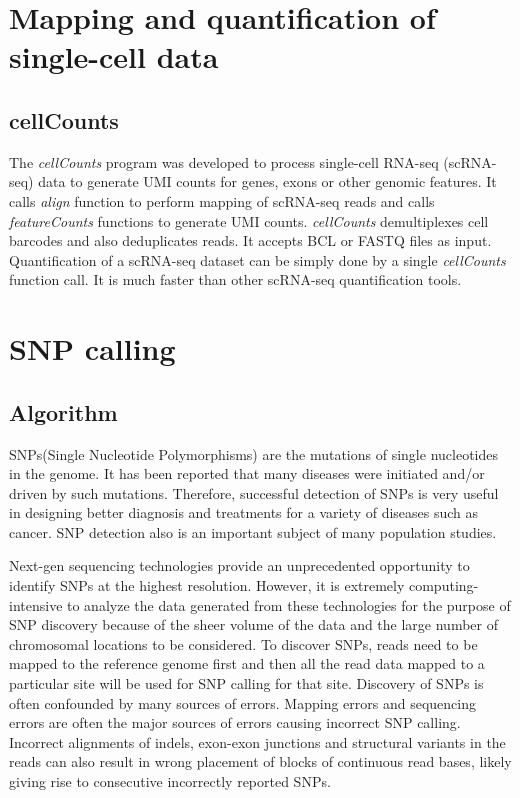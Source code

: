 \documentclass[12pt]{report}
\begin{document}
\chapter{Mapping and quantification of single-cell data}

\section{cellCounts}

The \emph{cellCounts} program was developed to process single-cell RNA-seq (scRNA-seq) data to generate UMI counts for genes, exons or other genomic features.
It calls \emph{align} function to perform mapping of scRNA-seq reads and calls \emph{featureCounts} functions to generate UMI counts.
\emph{cellCounts} demultiplexes cell barcodes and also deduplicates reads.
It accepts BCL or FASTQ files as input.
Quantification of a scRNA-seq dataset can be simply done by a single \emph{cellCounts} function call.
It is much faster than other scRNA-seq quantification tools.

\chapter{SNP calling}

\section{Algorithm}

SNPs(Single Nucleotide Polymorphisms) are the mutations of single nucleotides in the genome.
It has been reported that many diseases were initiated and/or driven by such mutations.
Therefore, successful detection of SNPs is very useful in designing better diagnosis and treatments for a variety of diseases such as cancer.
SNP detection also is an important subject of many population studies.

Next-gen sequencing technologies provide an unprecedented opportunity to identify SNPs at the highest resolution.
However, it is extremely computing-intensive to analyze the data generated from these technologies for the purpose of SNP discovery  because of the sheer volume of the data and the large number of chromosomal locations to be considered.
To discover SNPs, reads need to be mapped to the reference genome first and then all the read data mapped to a particular site will be used for SNP calling for that site.
Discovery of SNPs is often confounded by many sources of errors.
Mapping errors and sequencing errors are often the major sources of errors causing incorrect SNP calling.
Incorrect alignments of indels, exon-exon junctions and structural variants in the reads can also result in wrong placement of blocks of continuous read bases, likely giving rise to consecutive incorrectly reported SNPs.
\end{document}
